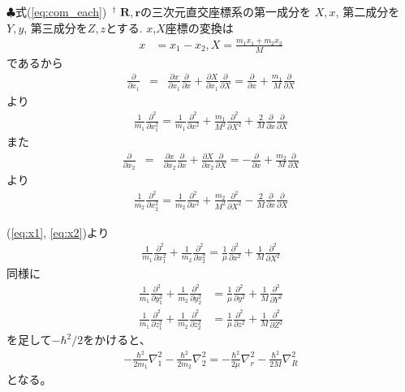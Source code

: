 \begin{itembox}{$\clubsuit$式{(\ref{eq:com_each}) $\,^\dagger$}}
\footnotesize
$\boldsymbol{R}, \boldsymbol{r}$の三次元直交座標系の第一成分を
$X, x$, 第二成分を$Y, y$, 第三成分を$Z, z$とする. 
$x$,$X$座標の変換は
\begin{align}
  x &= x_1 - x_2, 
  X = \frac{m_1 x_1 + m_2 x_2}{M} \nonumber 
\end{align}
であるから
\begin{eqnarray}
  \frac{\partial}{\partial x_1} &=& \frac{\partial x}{\partial x_1} \frac{\partial}{\partial x} +
  \frac{\partial X}{\partial x_1} \frac{\partial}{\partial X} =  \frac{\partial}{\partial x} +  \frac{m_1}{M}\frac{\partial}{\partial X}
\end{eqnarray}
より
\begin{align}
    \label{eq:x1}
  \frac{1}{m_1}\frac{\partial^2}{\partial x_1^2} =
  \frac{1}{m_1} \frac{\partial^2}{\partial x^2} + \frac{m_1}{M^2} \frac{\partial^2}{\partial X^2}
   + \frac{2}{M}\frac{\partial}{\partial x}\frac{\partial}{\partial X} 
\end{align}
また
\begin{eqnarray}
  \frac{\partial}{\partial x_2} &=& \frac{\partial x}{\partial x_2} \frac{\partial}{\partial x} +
  \frac{\partial X}{\partial x_2} \frac{\partial}{\partial X} =  - \frac{\partial}{\partial x} +  \frac{m_2}{M}\frac{\partial}{\partial X}
\end{eqnarray}
より
\begin{align}
  \label{eq:x2}
  \frac{1}{m_2}\frac{\partial^2}{\partial x_2^2} =
  \frac{1}{m_2} \frac{\partial^2}{\partial x^2} + \frac{m_2}{M^2} \frac{\partial^2}{\partial X^2}
   - \frac{2}{M}\frac{\partial}{\partial x}\frac{\partial}{\partial X} 
\end{align}

(\ref{eq:x1}, \ref{eq:x2})より
\begin{align}
 \frac{1}{m_1} \frac{\partial^2}{\partial x_1^2} +  \frac{1}{m_2} \frac{\partial^2}{\partial x_2^2} =
  \frac{1}{\mu}\frac{\partial^2}{\partial x^2} + \frac{1}{M}\frac{\partial^2}{\partial X^2}
\end{align}
同様に
\begin{align}
 \frac{1}{m_1} \frac{\partial^2}{\partial y_1^2} +  \frac{1}{m_2} \frac{\partial^2}{\partial y_2^2} &=
  \frac{1}{\mu}\frac{\partial^2}{\partial y^2} + \frac{1}{M}\frac{\partial^2}{\partial Y^2} \\
 \frac{1}{m_1} \frac{\partial^2}{\partial z_1^2} +  \frac{1}{m_2} \frac{\partial^2}{\partial z_2^2} &=
  \frac{1}{\mu}\frac{\partial^2}{\partial z^2} + \frac{1}{M}\frac{\partial^2}{\partial Z^2}
\end{align}
を足して$- \hbar^2/2$をかけると、
\begin{align}
 - \frac{\hbar^2}{2 m_1} \nabla_{1}^2  - \frac{\hbar^2}{2 m_2} \nabla_{2}^2 
= - \frac{\hbar^2}{2 \mu} \nabla_{r}^2  - \frac{\hbar^2}{2 M} \nabla_{R}^2 
\end{align}
となる。
\end{itembox}




